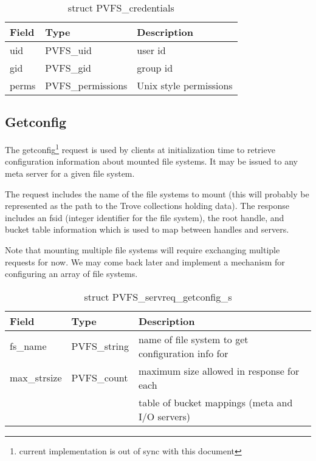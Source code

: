 \documentclass[11pt, letterpaper]{article} %
\begin{document}
\begin{table}[H]
\begin{tabular}{|l|l|l|}
\hline
Field & Type & Description \\
\hline
\hline
uid & PVFS\_uid & user id\\
\hline
gid & PVFS\_gid & group id\\
\hline
perms & PVFS\_permissions & Unix style permissions\\
\hline
\end{tabular}
\caption{struct PVFS\_credentials \label{tab:credentials}}
\end{table}

\subsection{Getconfig}

The getconfig\footnote{current implementation is out of sync with this
document} request is used by clients at initialization time to retrieve
configuration information about mounted file systems.  It may be issued
to any meta server for a given file system.

The request includes the name of the file systems to mount (this will
probably be represented as the path to the Trove collections holding
data).  The response includes an fsid (integer identifier for the file
system), the root handle, and bucket table information which is
used to map between handles and servers.

Note that mounting multiple file systems will require exchanging
multiple requests for now.  We may come back later and implement a
mechanism for configuring an array of file systems.

\begin{table}[H]
\begin{tabular}{|l|l|l|}
\hline
Field & Type & Description \\
\hline
\hline
fs\_name & PVFS\_string & name of file system to get configuration info for\\ 
\hline
max\_strsize & PVFS\_count & maximum size allowed in response for
each\\
 & & table of bucket mappings (meta and I/O servers)\\
\hline
\end{tabular}
\caption{struct PVFS\_servreq\_getconfig\_s
\label{tab:reqgetconfig}}
\end{table}
\end{document}
